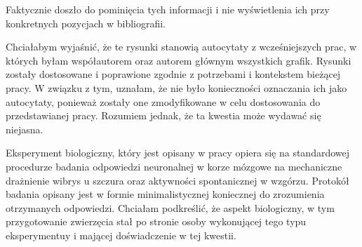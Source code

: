 \begin{frame}[t]
    \begin{block}{\tb}
    \end{block}

Faktycznie doszło do pominięcia tych informacji i nie wyświetlenia ich przy konkretnych pozycjach w bibliografii.

    \begin{block}{\tb}
    \end{block}


    Chciałabym wyjaśnić, że te rysunki stanowią autocytaty z wcześniejszych prac, w których byłam współautorem oraz autorem głównym wszystkich grafik. Rysunki zostały dostosowane i poprawione zgodnie z potrzebami i kontekstem bieżącej pracy. W związku z tym, uznałam, że nie było konieczności oznaczania ich jako autocytaty, ponieważ zostały one zmodyfikowane w celu dostosowania do przedstawianej pracy. Rozumiem jednak, że ta kwestia może wydawać się niejasna.


\end{frame}


  
\begin{frame}[t]

    \begin{block}{\tb}
    \end{block}
    Eksperyment biologiczny, który jest opisany w pracy opiera się na standardowej procedurze badania odpowiedzi neuronalnej w korze mózgowe na mechaniczne drażnienie wibrys u szczura oraz aktywności spontanicznej w wzgórzu. Protokół badania opisany jest w formie minimalistycznej koniecznej do zrozumienia otrzymanych odpowiedzi. Chciałam podkreślić, że aspekt biologiczny, w tym przygotowanie zwierzęcia stał po stronie osoby wykonującej tego typu eksperymentuy i mającej doświadczenie w tej kwestii.
\end{frame}


